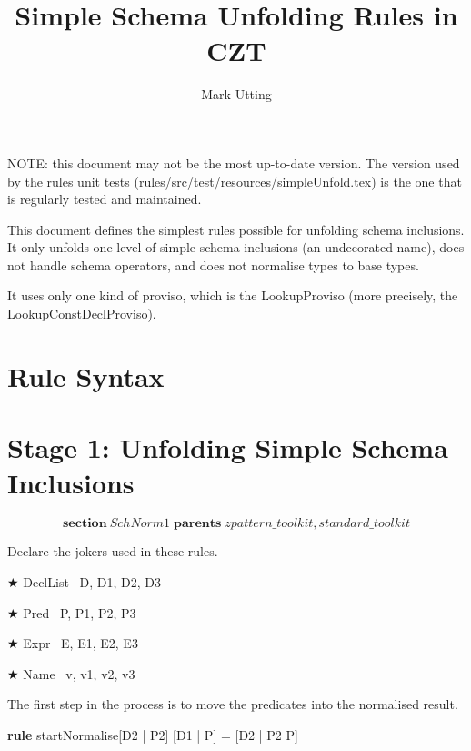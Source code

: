 \documentclass{article}
\title{Simple Schema Unfolding Rules in CZT}
\author{Mark Utting}
\newenvironment{zsection}{\[}{\]}
\newcommand{\SECTION}{\textbf{section}~}
\newcommand{\parents}{\mathrel{\textbf{parents}}}
\newenvironment{zedrule}[1]{\par\textbf{rule }#1\vspace{-1ex}\infrule}{\endinfrule}
\newcommand{\derives}{\derive{}}
\newenvironment{zedjoker}[1]{\par$\bigstar$ #1\ }{}
\begin{document}
\maketitle

NOTE: this document may not be the most up-to-date version.
The version used by the rules unit tests (rules/src/test/resources/simpleUnfold.tex)
is the one that is regularly tested and maintained.

This document defines the simplest rules possible for
unfolding schema inclusions.  It only unfolds one level of simple schema
inclusions (an undecorated name), does not handle
schema operators, and does not normalise types to base types.

It uses only one kind of proviso, which is the LookupProviso
(more precisely, the LookupConstDeclProviso).

\section*{Rule Syntax}

\section*{Stage 1: Unfolding Simple Schema Inclusions}

\begin{zsection}
  \SECTION SchNorm1 \parents zpattern\_toolkit, standard\_toolkit
\end{zsection}

Declare the jokers used in these rules.

\begin{zedjoker}{DeclList} D, D1, D2, D3 \end{zedjoker} \\
\begin{zedjoker}{Pred} P, P1, P2, P3 \end{zedjoker} \\
\begin{zedjoker}{Expr} E, E1, E2, E3 \end{zedjoker} \\
\begin{zedjoker}{Name} v, v1, v2, v3 \end{zedjoker} \\

\newcommand{\unfoldsTo}{\mathrel{\leadsto}}

The first step in the process is to move the predicates into
the normalised result.
\begin{zedrule}{startNormalise}
   [D1 | true] \unfoldsTo [D2 | P2]
\derives
   [D1 | P] = [D2 | P2 \land P]
\end{zedrule}
\end{document}

